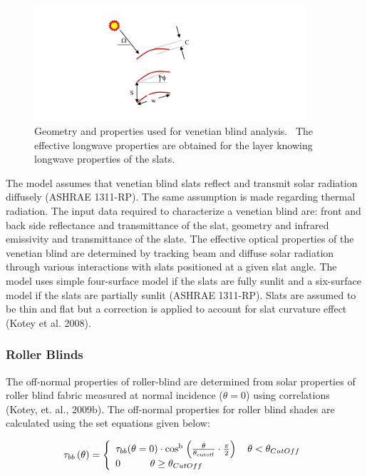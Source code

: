{\begin{figure}[hbtp] %
\centering
\includegraphics[width=0.9\textwidth, height=0.9\textheight, keepaspectratio=true]{media/image1846.svg.png}
\caption{Geometry and properties used for venetian blind analysis.~ The effective longwave properties are obtained for the layer knowing longwave properties of the slats. \protect \label{fig:geometry-and-properties-used-for-venetian}}
\end{figure}

The model assumes that venetian blind slats reflect and transmit solar radiation diffusely (ASHRAE 1311-RP). The same assumption is made regarding thermal radiation. The input data required to characterize a venetian blind are: front and back side reflectance and transmittance of the slat, geometry and infrared emissivity and transmittance of the slate. The effective optical properties of the venetian blind are determined by tracking beam and diffuse solar radiation through various interactions with slats positioned at a given slat angle. The model uses simple four-surface model if the slats are fully sunlit and a six-surface model if the slats are partially sunlit (ASHRAE 1311-RP). Slats are assumed to be thin and flat but a correction is applied to account for slat curvature effect (Kotey et al. 2008).

\subsubsection{Roller Blinds}\label{roller-blinds}

The off-normal properties of roller-blind are determined from solar properties of roller blind fabric measured at normal incidence ($\theta = 0$) using correlations (Kotey, et. al., 2009b). The off-normal properties for roller blind shades are calculated using the set equations given below:

\begin{equation}
{{\rm{\tau }}_{bb}}\left( {\rm{\theta }} \right) = \left\{ \begin{array}{l}{{\rm{\tau }}_{bb}}{\rm{(\theta }} = {\rm{0)}} \cdot {\rm{co}}{{\rm{s}}^{\rm{b}}}{\kern 1pt} \left( {\frac{{\rm{\theta }}}{{{{\rm{\theta }}_{{\rm{cutoff}}}}}} \cdot \frac{\pi }{2}} \right)\quad \theta  < {\theta_{CutOff}}\\0\quad \quad \quad \theta  \ge {\theta_{CutOff}}\end{array} \right.
\end{equation}

}
